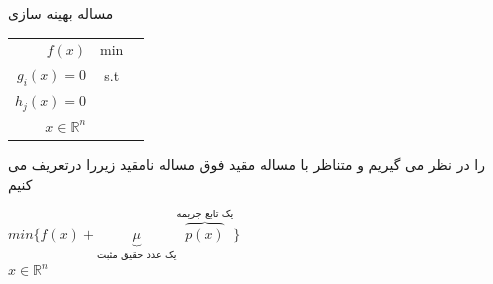 \documentclass[A4]{article}
\begin{document}
مساله بهینه سازی 
\begin{tabular}{ r | c  l }
  $f(x)$ & min\\
$g_i(x)=0$ & s.t\\
 $h_j(x)=0$ & \\
    $x\in \mathbb{R}^n$  &
\end{tabular}
را در نظر می گیریم و متناظر با مساله مقید فوق مساله نامقید زیررا درتعریف می کنیم
\\
\begin{flushleft}


${min} \{f(x)+\underbrace{\mu}_\text{یک عدد حقیق مثبت}\overbrace{ p(x)}^\text{یک تابع جریمه}\}$
\\

$ x\in \mathbb{R}^n$ 

\end{flushleft}
\end{document}
